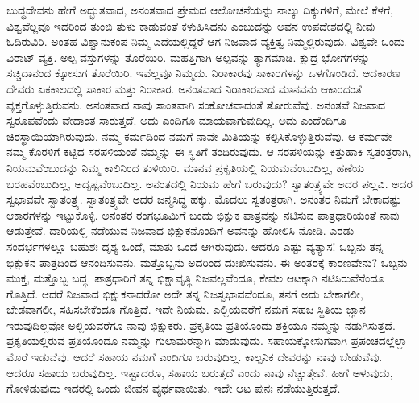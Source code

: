 ಬುದ್ಧದೇವನು ಹೇಗೆ ಅದ್ಭುತವಾದ, ಅನಂತವಾದ ಪ್ರೇಮದ ಆಲೋಚನೆಯನ್ನು ನಾಲ್ಕು ದಿಕ್ಕುಗಳಿಗೆ, ಮೇಲೆ ಕೆಳಗೆ, ವಿಶ್ವವೆಲ್ಲವೂ ಇದರಿಂದ ತುಂಬಿ ತುಳು ಕಾಡುವಂತೆ ಕಳುಹಿಸಿದನು ಎಂಬುದನ್ನು ಅವನ ಉಪದೇಶದಲ್ಲಿ ನೀವು ಓದಿರುವಿರಿ. ಅಂತಹ ವಿಶ್ವಾನುಕಂಪ ನಿಮ್ಮ ಎದೆಯಲ್ಲಿದ್ದರೆ ಆಗ ನಿಜವಾದ ವ್ಯಕ್ತಿತ್ವ ನಿಮ್ಮಲ್ಲಿರುವುದು. ವಿಶ್ವವೇ ಒಂದು ವಿರಾಟ್​ ವ್ಯಕ್ತಿ. ಅಲ್ಪ ವಸ್ತುಗಳನ್ನು ತೊರೆಯಿರಿ. ಮಹತ್ತಿಗಾಗಿ ಅಲ್ಪವನ್ನು ತ್ಯಾಗಮಾಡಿ. ಕ್ಷುದ್ರ ಭೋಗಗಳನ್ನು ಸಚ್ಚಿದಾನಂದ ಕ್ಕೋಸುಗ ತೊರೆಯಿರಿ. ಇವೆಲ್ಲವೂ ನಿಮ್ಮದು. ನಿರಾಕಾರವು ಸಾಕಾರಗಳನ್ನು ಒಳಗೊಂಡಿದೆ. ಆದಕಾರಣ ದೇವರು ಏಕಕಾಲದಲ್ಲಿ ಸಾಕಾರ ಮತ್ತು ನಿರಾಕಾರ. ಅನಂತವಾದ ನಿರಾಕಾರವಾದ ಮಾನವನು ಆಕಾರದಂತೆ ವ್ಯಕ್ತಗೊಳ್ಳುತ್ತಿರುವನು. ಅನಂತವಾದ ನಾವು ಸಾಂತವಾಗಿ ಸಂಕೋಚವಾದಂತೆ ತೋರುವೆವು. ಅನಂತವೆ ನಿಜವಾದ ಸ್ವರೂಪವೆಂದು ವೇದಾಂತ ಸಾರುತ್ತದೆ. ಅದು ಎಂದಿಗೂ ಮಾಯವಾಗುವುದಿಲ್ಲ. ಅದು ಎಂದೆಂದಿಗೂ ಚಿರಸ್ಥಾಯಿಯಾಗಿರುವುದು. ನಮ್ಮ ಕರ್ಮದಿಂದ ನಮಗೆ ನಾವೇ ಮಿತಿಯನ್ನು ಕಲ್ಪಿಸಿಕೊಳ್ಳುತ್ತಿರುವೆವು. ಆ ಕರ್ಮವೇ ನಮ್ಮ ಕೊರಳಿಗೆ ಕಟ್ಟಿದ ಸರಪಳಿಯಂತೆ ನಮ್ಮನ್ನು ಈ ಸ್ಥಿತಿಗೆ ತಂದಿರುವುದು. ಆ ಸರಪಳಿಯನ್ನು ಕಿತ್ತುಹಾಕಿ ಸ್ವತಂತ್ರರಾಗಿ, ನಿಯಮವೆಂಬುದನ್ನು ನಿಮ್ಮ ಕಾಲಿನಿಂದ ತುಳಿಯಿರಿ. ಮಾನವ ಪ್ರಕೃತಿಯಲ್ಲಿ ನಿಯಮವೆಂಬುದಿಲ್ಲ, ಹಣೆಯ ಬರಹವೆಂಬುದಿಲ್ಲ, ಅದೃಷ್ಟವೆಂಬುದಿಲ್ಲ. ಅನಂತದಲ್ಲಿ ನಿಯಮ ಹೇಗೆ ಬರುವುದು? ಸ್ವಾತಂತ್ರ್ಯವೇ ಅದರ ಪಲ್ಲವಿ. ಅದರ ಸ್ವಭಾವವೇ ಸ್ವಾತಂತ್ರ್ಯ. ಸ್ವಾತಂತ್ರ್ಯವೇ ಅದರ ಜನ್ಮಸಿದ್ಧ ಹಕ್ಕು. ಮೊದಲು ಸ್ವತಂತ್ರರಾಗಿ. ಅನಂತರ ನಿಮಗೆ ಬೇಕಾದಷ್ಟು ಆಕಾರಗಳನ್ನು ಇಟ್ಟುಕೊಳ್ಳಿ. ಅನಂತರ ರಂಗಭೂಮಿಗೆ ಬಂದು ಭಿಕ್ಷುಕ ಪಾತ್ರವನ್ನು ನಟಿಸುವ ಪಾತ್ರಧಾರಿಯಂತೆ ನಾವು ಆಡುತ್ತೇವೆ. ದಾರಿಯಲ್ಲಿ ನಡೆಯುವ ನಿಜವಾದ ಭಿಕ್ಷುಕನೊಂದಿಗೆ ಅವನನ್ನು ಹೋಲಿಸಿ ನೋಡಿ. ಎರಡು ಸಂದರ್ಭಗಳಲ್ಲೂ ಬಹುಶಃ ದೃಶ್ಯ ಒಂದೆ, ಮಾತು ಒಂದೆ ಆಗಿರುವುದು. ಆದರೂ ಎಷ್ಟು ವ್ಯತ್ಯಾಸ! ಒಬ್ಬನು ತನ್ನ ಭಿಕ್ಷುಕನ ಪಾತ್ರದಿಂದ ಆನಂದಿಸುವನು. ಮತ್ತೊಬ್ಬನು ಅದರಿಂದ ದುಃಖಿಸುವನು. ಈ ಅಂತರಕ್ಕೆ ಕಾರಣವೇನು? ಒಬ್ಬನು ಮುಕ್ತ, ಮತ್ತೊಬ್ಬ ಬದ್ಧ. ಪಾತ್ರಧಾರಿಗೆ ತನ್ನ ಭಿಕ್ಷಾವೃತ್ಥಿ ನಿಜವಲ್ಲವೆಂದೂ, ಕೇವಲ ಆಟಕ್ಕಾಗಿ ನಟಿಸಿರುವೆನೆಂದೂ ಗೊತ್ತಿದೆ. ಆದರೆ ನಿಜವಾದ ಭಿಕ್ಷುಕನಾದರೋ ಅದೇ ತನ್ನ ನಿಜಸ್ವಭಾವವೆಂದೂ, ತನಗೆ ಅದು ಬೇಕಾಗಲೀ, ಬೇಡವಾಗಲೀ, ಸಹಿಸಬೇಕೆಂದೂ ಗೊತ್ತಿದೆ. ಇದೇ ನಿಯಮ. ಎಲ್ಲಿಯವರೆಗೆ ನಮಗೆ ಸಹಜ ಸ್ಥಿತಿಯ ಜ್ಞಾನ ಇರುವುದಿಲ್ಲವೋ ಅಲ್ಲಿಯವರೆಗೂ ನಾವು ಭಿಕ್ಷುಕರು. ಪ್ರಕೃತಿಯ ಪ್ರತಿಯೊಂದು ಶಕ್ತಿಯೂ ನಮ್ಮನ್ನು ನಡುಗಿಸುತ್ತದೆ. ಪ್ರಕೃತಿಯಲ್ಲಿರುವ ಪ್ರತಿಯೊಂದೂ ನಮ್ಮನ್ನು ಗುಲಾಮರನ್ನಾಗಿ ಮಾಡುವುದು. ಸಹಾಯಕ್ಕೋಸುಗವಾಗಿ ಪ್ರಪಂಚದಲ್ಲೆಲ್ಲಾ ಮೊರೆ ಇಡುವೆವು. ಆದರೆ ಸಹಾಯ ನಮಗೆ ಎಂದಿಗೂ ಬರುವುದಿಲ್ಲ. ಕಾಲ್ಪನಿಕ ದೇವರನ್ನು ನಾವು ಬೇಡುವೆವು. ಆದರೂ ಸಹಾಯ ಬರುವುದಿಲ್ಲ. ಇಷ್ಟಾದರೂ, ಸಹಾಯ ಬರುತ್ತದೆ ಎಂದು ನಾವು ನೆಚ್ಚುತ್ತೇವೆ. ಹೀಗೆ ಅಳುವುದು, ಗೋಳಿಡುವುದು ಇದರಲ್ಲಿ ಒಂದು ಜೀವನ ವ್ಯರ್ಥವಾಯಿತು. ಇದೇ ಆಟ ಪುನಃ ನಡೆಯುತ್ತಿರುತ್ತದೆ. 

\vskip 6pt

